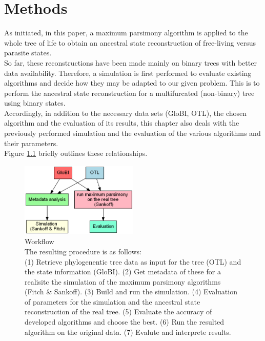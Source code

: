 \chapter{Methods}
  As initiated, in this paper, a maximum parsimony algorithm is applied to the whole tree of life to 
    obtain an ancestral state reconstruction of free-living versus parasite states. \\
  So far, these reconstructions have been made mainly on binary trees with better data availability. 
    Therefore, a simulation is first performed to evaluate existing algorithms and decide how they 
    may be adapted to our given problem. This is to perform the ancestral state reconstruction for a 
    multifurcated (non-binary) tree using binary states. \\
  Accordingly, in addition to the necessary data sets (GloBI, OTL), the chosen algorithm and the 
    evaluation of its results, this chapter also deals with the previously performed simulation and 
    the evaluation of the various algorithms and their parameters. \\
  Figure \ref{fig:workflow} briefly outlines these relationships.
  \begin{figure}[h!]
    \centering
    \includegraphics[width=0.5\textwidth]{Figures/Workflow-overview.png}
    \caption{Workflow \\
      The resulting procedure is as follows: \\
      (1) Retrieve phylogenentic tree data as input for the tree (OTL) and the state information (GloBI).
      (2) Get metadata of these for a realisitc the simulation of the maximum parsimony algorithms (Fitch \& Sankoff).
      (3) Build and run the simulation.
      (4) Evaluation of parameters for the simulation and the ancestral state reconstruction of the real tree.
      (5) Evaluate the accuracy of developed algorithms and choose the best.
      (6) Run the resulted algorithm on the original data.
      (7) Evalute and interprete results. %
    }
    \label{fig:workflow}
  \end{figure}

